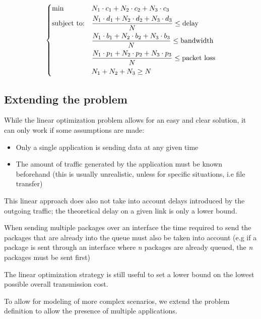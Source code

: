 	\begin{equation}\label{eq:linear_formulation_final}
		\begin{dcases}
			\begin{aligned}
				& {\text{min}}
				& & N_1 \cdot c_1 + N_2 \cdot c_2 +	N_3 \cdot c_3 \\
				& \text{subject to:}
				& & \frac
				{N_1 \cdot d_1 + N_2 \cdot d_2  + N_3 \cdot d_3 }
				{N}
				\le \text{delay} \\
				& & & \frac
				{N_1 \cdot b_1 + N_2 \cdot b_2  + N_3 \cdot b_3 }
				{N}
				\le \text{bandwidth} \\
				& & & \frac
				{N_1 \cdot p_1 + N_2 \cdot p_2 + N_3 \cdot p_3 }
				{N}
				\le \text{packet loss} \\
				& & &
				N_1 + N_2 + N_3 \ge N
			\end{aligned}
		\end{dcases}
	\end{equation}
	
	
	
	\subsection{Extending the problem}
	While the linear optimization problem allows for an easy and clear solution, it can only work if some assumptions are made:
	
	\begin{itemize}
		\item Only a single application is sending data at any given time
		\item The amount of traffic generated by the application must be known beforehand (this is usually unrealistic, unless for specific situations, i.e file transfer)
	\end{itemize}
	
	This linear approach does also not take into account delays introduced by the outgoing traffic; the theoretical delay on a given link is only a lower bound.
	
	When sending multiple packages over an interface the time required to send the packages that are already into the queue must also be taken into account (e.g if  a package is sent through an interface where \textit{n} packages are already queued, the \textit{n} packages must be sent first)
	
	The linear optimization strategy is still useful to set a lower bound on the lowest possible overall transmission cost.
	
	To allow for modeling of more complex scenarios, we extend the problem definition to allow the presence of multiple applications.
	
